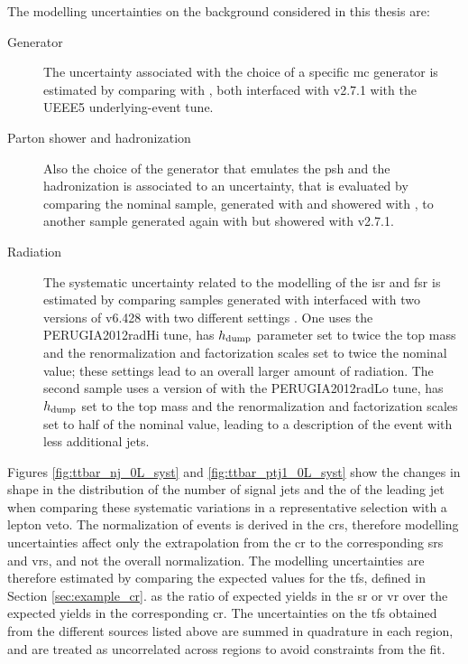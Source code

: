 The modelling uncertainties on the \ttbar background considered in this thesis are:
\begin{description}
\item[Generator] The uncertainty associated with the choice of a specific \gls{mc} generator is estimated by comparing \PowhegBox with \aNLO, both interfaced with \HWpp v2.7.1 with the UEEE5 underlying-event tune.

\item[Parton shower and hadronization] Also the choice of the generator that emulates the \gls{psh} and the hadronization is associated to an uncertainty, that is evaluated by comparing the nominal sample, generated with \PowhegBox and showered with \PY, to another sample generated again with \PowhegBox but showered with \HWpp v2.7.1. 

\item[Radiation] The systematic uncertainty related to the modelling of the \gls{isr} and \gls{fsr} is estimated by comparing samples
generated with \PowhegBox interfaced with two versions of \PY v6.428 with two different settings \cite{Skands:2010ak}. 
One uses the PERUGIA2012radHi tune, has $h_{\rm{dump}}$ parameter set to twice the top mass and the renormalization and factorization scales set to twice the nominal value; these settings lead to an overall larger amount of radiation. The second sample uses a version of \PY with the PERUGIA2012radLo tune, has $h_{\rm{dump}}$ set to the top mass and the renormalization and factorization scales set to half of the nominal value, leading to a description of the event with less additional jets.

\end{description}

Figures \ref{fig:ttbar_nj_0L_syst} and \ref{fig:ttbar_ptj1_0L_syst} show the changes in shape in the distribution of the number of signal jets and the \pt of the leading jet when comparing these systematic variations in a representative selection with a lepton veto.
The normalization of \ttbar events is derived in the \glspl{cr}, therefore modelling uncertainties affect only the extrapolation from 
the \gls{cr} to the corresponding \glspl{sr} and \glspl{vr}, and not the overall normalization. 
The modelling uncertainties are therefore estimated by comparing the expected values for the \glspl{tf}, defined in Section \ref{sec:example_cr}.
as the ratio of expected yields in the \gls{sr} or \gls{vr} over the expected yields in the corresponding \gls{cr}. 
The uncertainties on the \glspl{tf} obtained from the different sources listed above are summed in quadrature in each region, and are treated as uncorrelated across regions to avoid 
constraints from the fit. 


